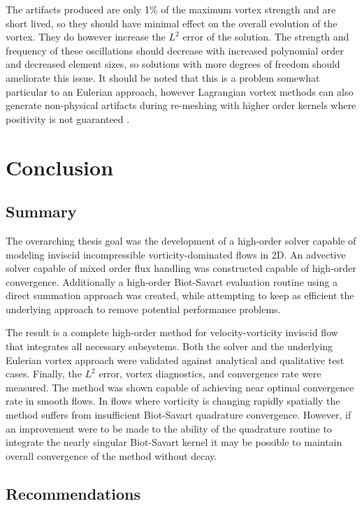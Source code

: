 \documentclass[letterpaper,12pt]{report}
\begin{document}
The artifacts produced are only 1\% of the maximum vortex strength and are short lived, so they should have minimal effect on the overall evolution of the vortex. They do however increase the $L^2$ error of the solution. The strength and frequency of these oscillations should decrease with increased polynomial order and decreased element sizes, so solutions with more degrees of freedom should ameliorate this issue. It should be noted that this is a problem somewhat particular to an Eulerian approach, however Lagrangian vortex methods can also generate non-physical artifacts during re-meshing with higher order kernels where positivity is not guaranteed \cite{Koum1997}.

\chapter{Conclusion}
\section{Summary}
The overarching thesis goal was the development of a high-order solver capable of modeling inviscid incompressible vorticity-dominated flows in 2D. An advective solver capable of mixed order flux handling was constructed capable of high-order convergence. Additionally a high-order Biot-Savart evaluation routine using a direct summation approach was created, while attempting to keep as efficient the underlying approach to remove potential performance problems.

The result is a complete high-order method for velocity-vorticity inviscid flow that integrates all necessary subsystems. Both the solver and the underlying Eulerian vortex approach were validated against analytical and qualitative test cases. Finally, the $L^2$ error, vortex diagnostics, and convergence rate were measured. The method was shown capable of achieving near optimal convergence rate in smooth flows. In flows where vorticity is changing rapidly spatially the method suffers from insufficient Biot-Savart quadrature convergence. However, if an improvement were to be made to the ability of the quadrature routine to integrate the nearly singular Biot-Savart kernel it may be possible to maintain overall convergence of the method without decay.

\section{Recommendations}
\end{document}
